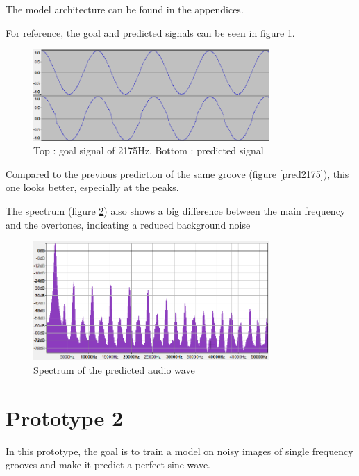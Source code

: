 \documentclass[12pt, twoside]{article}
\begin{document}
The model architecture can be found in the appendices.

For reference, the goal and predicted signals can be seen in figure \ref{predm1}.
\begin{figure}
	\centering
	\includegraphics[width=0.8\textwidth]{../images/predm1.png}
	\caption{Top : goal signal of 2175Hz. Bottom : predicted signal}
	\label{predm1}
\end{figure}
Compared to the previous prediction of the same groove (figure \ref{pred2175}), this one looks better, especially at the peaks.

The spectrum (figure \ref{spectrumm1}) also shows a big difference between the main frequency and the overtones, indicating a reduced background noise
\begin{figure}
	\centering
	\includegraphics[width=0.8\textwidth]{../images/spectrum_m1.png}
	\caption{Spectrum of the predicted audio wave}
	\label{spectrumm1}
\end{figure}
\section{Prototype 2}
In this prototype, the goal is to train a model on noisy images of single frequency grooves and make it predict a perfect sine wave.
\end{document}
